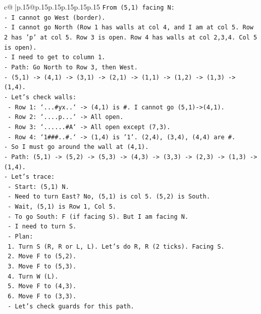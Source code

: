\documentclass{article}
\begin{document}
{\begin{supertabular}{c@{$\;$}|p{.15\linewidth}@{}p{.15\linewidth}p{.15\linewidth}p{.15\linewidth}p{.15\linewidth}p{.15\linewidth}}
{{{\texttt{From (5,1) facing N:} \\
\texttt{{-} I cannot go West (border).} \\
\texttt{{-} I cannot go North (Row 1 has walls at col 4, and I am at col 5. Row 2 has 'p' at col 5. Row 3 is open. Row 4 has walls at col 2,3,4. Col 5 is open).} \\
\texttt{{-} I need to get to column 1.} \\
\texttt{{-} Path: Go North to Row 3, then West.} \\
\texttt{{-} (5,1) {-}> (4,1) {-}> (3,1) {-}> (2,1) {-}> (1,1) {-}> (1,2) {-}> (1,3) {-}> (1,4).} \\
\texttt{{-} Let's check walls:} \\
\texttt{  {-} Row 1: `...\#yx..` {-}> (4,1) is \#. I cannot go (5,1){-}>(4,1).} \\
\texttt{  {-} Row 2: `....p...` {-}> All open.} \\
\texttt{  {-} Row 3: `......\#A` {-}> All open except (7,3).} \\
\texttt{  {-} Row 4: `1\#\#\#..\#.` {-}> (1,4) is '1'. (2,4), (3,4), (4,4) are \#.} \\
\texttt{{-} So I must go around the wall at (4,1).} \\
\texttt{{-} Path: (5,1) {-}> (5,2) {-}> (5,3) {-}> (4,3) {-}> (3,3) {-}> (2,3) {-}> (1,3) {-}> (1,4).} \\
\texttt{{-} Let's trace:} \\
\texttt{  {-} Start: (5,1) N.} \\
\texttt{  {-} Need to turn East? No, (5,1) is col 5. (5,2) is South.} \\
\texttt{  {-} Wait, (5,1) is Row 1, Col 5.} \\
\texttt{  {-} To go South: F (if facing S). But I am facing N.} \\
\texttt{  {-} I need to turn S.} \\
\texttt{  {-} Plan:} \\
\texttt{    1. Turn S (R, R or L, L). Let's do R, R (2 ticks). Facing S.} \\
\texttt{    2. Move F to (5,2).} \\
\texttt{    3. Move F to (5,3).} \\
\texttt{    4. Turn W (L).} \\
\texttt{    5. Move F to (4,3).} \\
\texttt{    6. Move F to (3,3).} \\
\texttt{  {-} Let's check guards for this path.} \\
}}}
\end{supertabular}}
\end{document}
